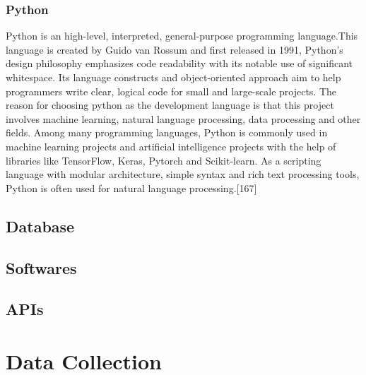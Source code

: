 \subsubsection{Python}
Python is an high-level, interpreted, general-purpose programming language.This language is created by Guido van Rossum and first released in 1991, Python's design philosophy emphasizes code readability with its notable use of significant whitespace. Its language constructs and object-oriented approach aim to help programmers write clear, logical code for small and large-scale projects. The reason for choosing python as the development language is that this project involves machine learning, natural language processing, data processing and other fields. Among many programming languages, Python is commonly used in machine learning projects and artificial intelligence projects with the help of libraries like TensorFlow, Keras, Pytorch and Scikit-learn. As a scripting language with modular architecture, simple syntax and rich text processing tools, Python is often used for natural language processing.[167]
\subsection{Database}
\subsection{Softwares}
\subsection{APIs}
\section{Data Collection}

